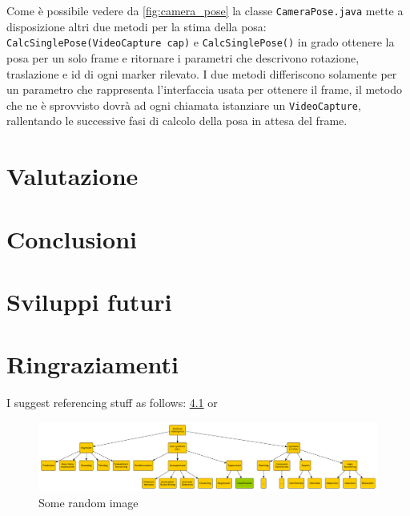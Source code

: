 \documentclass[12pt,a4paper,openright,twoside]{book}
\begin{document}
Come è possibile vedere da \ref{fig:camera_pose} la classe \texttt{CameraPose.java} mette a disposizione altri due metodi per la stima della posa: \texttt{CalcSinglePose(VideoCapture cap)} e \texttt{CalcSinglePose()} in grado ottenere la posa per un solo frame e ritornare i parametri che descrivono rotazione, traslazione e id di ogni marker rilevato.
I due metodi differiscono solamente per un parametro che rappresenta l'interfaccia usata per ottenere il frame, il metodo che ne è sprovvisto dovrà ad ogni chiamata istanziare un \texttt{VideoCapture}, rallentando le successive fasi di calcolo della posa in attesa del frame.

\chapter{Valutazione}
\chapter{Conclusioni}
\chapter{Sviluppi futuri}
\chapter{Ringraziamenti}

I suggest referencing stuff as follows: \cref{fig:random-image} or 

\begin{figure}
    \centering
    \includegraphics[width=0.8\linewidth]{figures/random-image.pdf}
    \caption{Some random image}
    \label{fig:random-image}
\end{figure}
\end{document}

